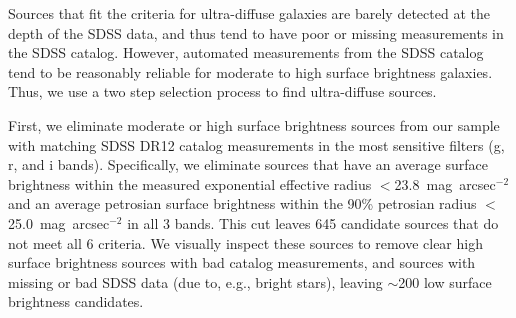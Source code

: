 \documentclass[twocolumn]{aastex6}
\newcommand{\msun}{M_{\odot}}
\def\msun{$M_\odot$}
\begin{document}
Sources that fit the criteria for ultra-diffuse galaxies are barely detected at the depth of the SDSS data, and thus tend to have poor or missing measurements in the SDSS catalog. However, automated measurements from the SDSS catalog tend to be reasonably reliable for moderate to high surface brightness galaxies. Thus, we use a two step selection process to find ultra-diffuse sources.

First, we eliminate moderate or high surface brightness sources from our sample with matching SDSS DR12 catalog measurements in the most sensitive filters (g, r, and i bands). %
Specifically, we eliminate sources that have an average surface brightness within the measured exponential effective radius %
$<$23.8~mag~arcsec$^{-2}$ and an average petrosian surface brightness within the 90\% petrosian radius %
$<$25.0~mag~arcsec$^{-2}$ in all 3 bands.
This cut leaves 645 candidate sources that do not meet all 6 criteria. We visually inspect these sources to remove clear high surface brightness sources with bad catalog measurements, and sources with missing or bad SDSS data (due to, e.g., bright stars), leaving  $\sim$200 low surface brightness candidates.
\end{document}
